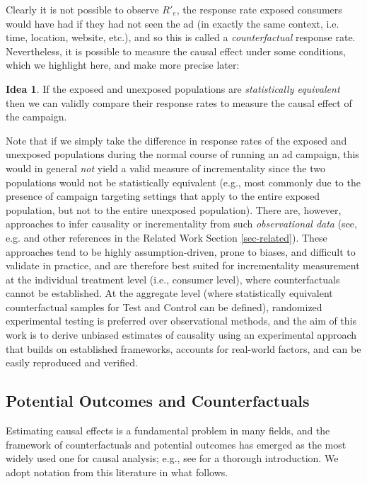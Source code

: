 \documentclass[11pt,a4paper]{article}
\theoremstyle{definition}
\theoremstyle{remark}
\theoremstyle{definition}
\theoremstyle{definition}
\theoremstyle{definition}
\theoremstyle{definition}
\newtheorem{idea}{Idea}[section]
\theoremstyle{definition}
\theoremstyle{definition}
\begin{document}
Clearly it is not possible to observe $R'_e$, the response rate exposed consumers would have had if they had not seen the ad (in exactly the same context, i.e. time, location, website, etc.), and so this is called a {\em counterfactual} response rate. 
Nevertheless, it is possible to measure the causal effect under some conditions, which we highlight here, and make more precise later:
\begin{idea}\label{idea-stat}\small
If the exposed and unexposed populations are {\em statistically equivalent} then we can validly compare their response rates to measure the causal effect of the campaign. 
\end{idea}
Note that if we simply take the difference in response rates of the exposed and unexposed populations during the normal course of running an ad campaign, this would in general \textit{not} yield a valid measure of incrementality since the two populations would not be statistically equivalent (e.g., most commonly due to the presence of campaign targeting settings that apply to the entire exposed population, but not to the entire unexposed population).
There are, however, approaches to infer causality or incrementality from such \textit{observational data} (see, e.g. \cite{Austin_An_2011} and other references in the Related Work Section \ref{sec-related}). These approaches tend to be highly assumption-driven, prone to biases, and difficult to validate in practice, and are therefore best suited for incrementality measurement at the individual treatment level (i.e., consumer level), where counterfactuals cannot be established. At the aggregate level (where statistically equivalent counterfactual samples for Test and Control can be defined), randomized experimental testing is preferred over observational methods, and the aim of this work is to derive unbiased estimates of causality using an experimental approach that builds on established frameworks, accounts for real-world factors, and can be easily reproduced and verified.


\subsection{Potential Outcomes and Counterfactuals} \label{sec-potential}


Estimating causal effects is a fundamental problem in many fields, and the framework of counterfactuals and potential outcomes has emerged as 
the most widely used one for causal analysis; e.g., see \cite{Little_Causal_2000} for a thorough introduction. 
We adopt notation from this literature in what follows.
\end{document}
